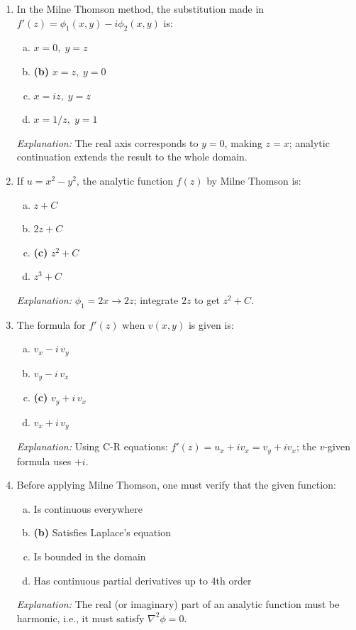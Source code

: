 \documentclass[12pt,a4paper]{article}
\begin{document}
\begin{enumerate}
  \item In the Milne Thomson method, the substitution made in \( f'(z) = \phi_1(x,y) - i\phi_2(x,y) \) is:
  \begin{enumerate}[(a)]
    \item \( x = 0,\; y = z \)
    \item \textbf{(b)} \( x = z,\; y = 0 \)
    \item \( x = iz,\; y = z \)
    \item \( x = 1/z,\; y = 1 \)
  \end{enumerate}
  \textit{Explanation:} The real axis corresponds to \( y = 0 \), making \( z = x \); analytic continuation extends the result to the whole domain.

  \item If \( u = x^2 - y^2 \), the analytic function \( f(z) \) by Milne Thomson is:
  \begin{enumerate}[(a)]
    \item \( z + C \)
    \item \( 2z + C \)
    \item \textbf{(c)} \( z^2 + C \)
    \item \( z^3 + C \)
  \end{enumerate}
  \textit{Explanation:} \( \phi_1 = 2x \to 2z \); integrate \( 2z \) to get \( z^2 + C \).

  \item The formula for \( f'(z) \) when \( v(x,y) \) is given is:
  \begin{enumerate}[(a)]
    \item \( v_x - i\,v_y \)
    \item \( v_y - i\,v_x \)
    \item \textbf{(c)} \( v_y + i\,v_x \)
    \item \( v_x + i\,v_y \)
  \end{enumerate}
  \textit{Explanation:} Using C-R equations: \( f'(z) = u_x + iv_x = v_y + iv_x \); the \( v \)-given formula uses \( +i \).

  \item Before applying Milne Thomson, one must verify that the given function:
  \begin{enumerate}[(a)]
    \item Is continuous everywhere
    \item \textbf{(b)} Satisfies Laplace's equation
    \item Is bounded in the domain
    \item Has continuous partial derivatives up to 4th order
  \end{enumerate}
  \textit{Explanation:} The real (or imaginary) part of an analytic function must be harmonic, i.e., it must satisfy \( \nabla^2 \phi = 0 \).


\end{enumerate}
\end{document}
